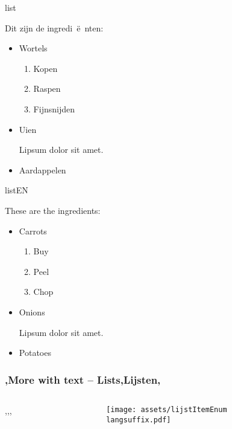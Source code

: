 \endDetail


\begin{saveblock}{list}
    \begin{highlightblock}[linewidth=0.5\textwidth,gobble=8]
        Dit zijn de ingredi~\"e~nten:
        \begin{itemize}
            \item Wortels
            \begin{enumerate}
                \item Kopen
                \item Raspen
                \item Fijnsnijden
            \end{enumerate}			
            \item Uien
            
            Lipsum dolor sit amet.
            \item Aardappelen
        \end{itemize}
    \end{highlightblock}
\end{saveblock}

\begin{saveblock}{listEN}
    \begin{highlightblock}[linewidth=0.5\textwidth,gobble=8]
        These are the ingredients:
        \begin{itemize}
            \item Carrots
            \begin{enumerate}
                \item Buy
                \item Peel
                \item Chop
            \end{enumerate}
            \item Onions
            
            Lipsum dolor sit amet.
            \item Potatoes
        \end{itemize}
    \end{highlightblock}
\end{saveblock}

\begin{frame}
    \frametitle{\lang,More with text -- Lists,Lijsten,}
    
    \begin{columns}
        \begin{column}{0.5\textwidth}
            \lang,,,
        \end{column}
        \begin{column}{0.5\textwidth}
            \texttt{[image: assets/lijstItemEnum\\langsuffix.pdf]}
        \end{column}
    \end{columns}
\end{frame}

